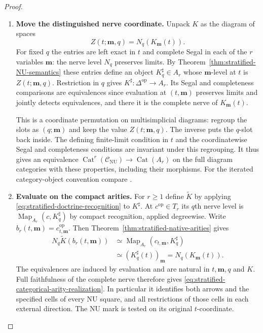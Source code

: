 \documentclass[oneside]{article}
\theoremstyle{plain}
\theoremstyle{definition}
\theoremstyle{remark}
\newcommand{\CNU}{\mathcal C_{\mathrm{NU}}}
\newcommand{\Map}{\operatorname{Map}}
\newcommand{\op}{\mathrm{op}}
\begin{document}
\begin{proof}
\leavevmode
\begin{enumerate}
\item \textbf{Move the distinguished nerve coordinate.}
Unpack $K$ as the diagram of spaces
\[
 Z(t;\mathbf m,q)=N_q(K_{\mathbf m}(t)).
\]
For fixed $q$ the entries are left exact in $t$ and complete Segal
in each of the $r$ variables $\mathbf m$: the nerve level $N_q$
preserves limits. By Theorem~\ref{thm:stratified-NU-semantics}
these entries define an object $K^\sharp_q\in A_r$ whose
$\mathbf m$-level at $t$ is $Z(t;\mathbf m,q)$. Restriction in
$q$ gives $K^\sharp:\Delta^{\op}\to A_r$. Its Segal and
completeness comparisons are equivalences since evaluation at
$(t,\mathbf m)$ preserves limits and jointly detects equivalences,
and there it is the complete nerve of $K_{\mathbf m}(t)$.

This is a coordinate permutation on multisimplicial diagrams:
regroup the slots as $(q;\mathbf m)$ and keep the value
$Z(t;\mathbf m,q)$. The inverse puts the $q$-slot back inside.
The defining finite-limit condition in $t$ and the coordinatewise
Segal and completeness conditions are invariant under this
regrouping. It thus gives an equivalence
$\operatorname{Cat}^r(\CNU)\to\operatorname{Cat}(A_r)$ on the
full diagram categories with these properties, including their
morphisms. For the iterated category-object convention compare
\cite[Def.~4.1 and Rem.~4.3]{HaugsengSpans}.

\item \textbf{Evaluate on the compact arities.}
For $r\geq1$ define $\widetilde K$ by applying
\eqref{eq:stratified-doctrine-recognition} to $K^\sharp$.
At $c^{\op}\in T_r$ its $q$th nerve level is
$\Map_{A_r}(c,K^\sharp_q)$ by compact recognition, applied degreewise.
Write $b_r(t,\mathbf m)=c_{t,\mathbf m}^{\op}$. Then
Theorem~\ref{thm:stratified-native-arities} gives
\[
 \begin{aligned}
 N_q\widetilde K(b_r(t,\mathbf m))
 &\simeq \Map_{A_r}(c_{t,\mathbf m},K^\sharp_q)\\
 &\simeq (K^\sharp_q(t))_{\mathbf m}
  = N_q(K_{\mathbf m}(t)).
 \end{aligned}
\]
The equivalences are induced by evaluation and are natural in
$t,\mathbf m,q$ and $K$. Full faithfulness of the complete nerve
therefore gives \eqref{eq:stratified-categorical-arity-realization}.
In particular it identifies both arrows and the specified cells of
every NU square, and all restrictions of those cells in each external
direction. The NU mark is tested on its original $t$-coordinate.


\end{enumerate}
\end{proof}
\end{document}
